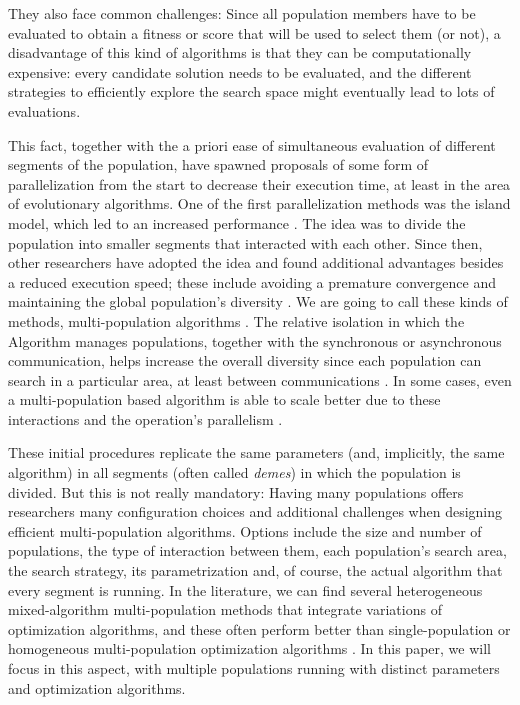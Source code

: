 \documentclass[runningheads]{llncs}
\begin{document}
They also face common challenges: Since all population members have to
be evaluated to obtain a fitness or score that will be used to select
them (or not), a disadvantage of this kind of algorithms is that they
can be computationally expensive: every candidate solution needs to be
evaluated, and the different strategies to efficiently explore the
search space might eventually lead to lots of evaluations.

This fact, together with the a priori ease of simultaneous evaluation
of different segments of the population, have spawned proposals of
some form of parallelization from the start
\cite{muhlenbein1988evolution} to decrease their execution time, at
least in the area of evolutionary algorithms. One of the first
parallelization methods was the island model, which led to an
increased performance
\cite{gorges1990explicit,grosso1985computer}. The idea was to divide
the population into smaller segments that interacted with each
other. Since then, other researchers have adopted the idea and found
additional advantages besides a reduced execution speed; these include
avoiding a premature convergence and maintaining the global
population's diversity \cite{li2015multi}. We are going to call these
kinds of methods, multi-population algorithms \cite{Ma2019}. The
relative isolation in which the Algorithm manages populations,
together with the synchronous or asynchronous communication, helps
increase the overall diversity since each population can search in a
particular area, at least between communications
\cite{li2016multi,wu2016differential}. In some cases, even a
multi-population based algorithm is able to scale better due to these
interactions and the operation's parallelism \cite{ALBA20027}.

These initial procedures replicate the same parameters (and,
implicitly, the same algorithm) in all
segments (often called {\em demes}) in which the population is
divided. But this is not really mandatory: Having many populations
offers researchers many configuration choices and additional
challenges when designing efficient multi-population algorithms.
Options include the size and number of populations, the type of
interaction between them, each population's search area, the search
strategy, its parametrization and, of course, the actual algorithm
that every segment is running. In the literature, we can find several
heterogeneous mixed-algorithm multi-population methods that integrate
variations of optimization algorithms, and these often perform better
than single-population or homogeneous multi-population optimization
algorithms \cite{wu2016differential,nseef2016adaptive}. In this paper,
we will focus in this aspect, with multiple populations running with
distinct parameters and optimization algorithms.
\end{document}
